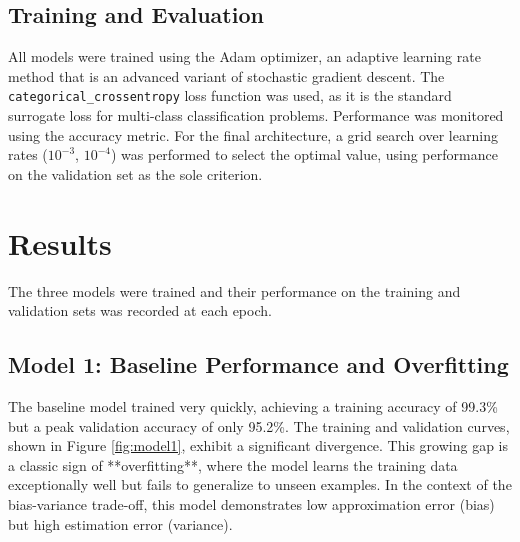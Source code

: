 \documentclass[pdflatex,sn-mathphys-num]{sn-jnl}%
\theoremstyle{thmstyleone}%
\theoremstyle{thmstyletwo}%
\theoremstyle{thmstylethree}%
\begin{document}
\subsection{Training and Evaluation}
All models were trained using the Adam optimizer, an adaptive learning rate method that is an advanced variant of stochastic gradient descent. The \texttt{categorical\_crossentropy} loss function was used, as it is the standard surrogate loss for multi-class classification problems. Performance was monitored using the accuracy metric. For the final architecture, a grid search over learning rates ($10^{-3}$, $10^{-4}$) was performed to select the optimal value, using performance on the validation set as the sole criterion.

\section{Results}\label{sec2}

The three models were trained and their performance on the training and validation sets was recorded at each epoch.

\subsection{Model 1: Baseline Performance and Overfitting}
The baseline model trained very quickly, achieving a training accuracy of 99.3\% but a peak validation accuracy of only 95.2\%. The training and validation curves, shown in Figure \ref{fig:model1}, exhibit a significant divergence. This growing gap is a classic sign of **overfitting**, where the model learns the training data exceptionally well but fails to generalize to unseen examples. In the context of the bias-variance trade-off, this model demonstrates low approximation error (bias) but high estimation error (variance).
\end{document}
